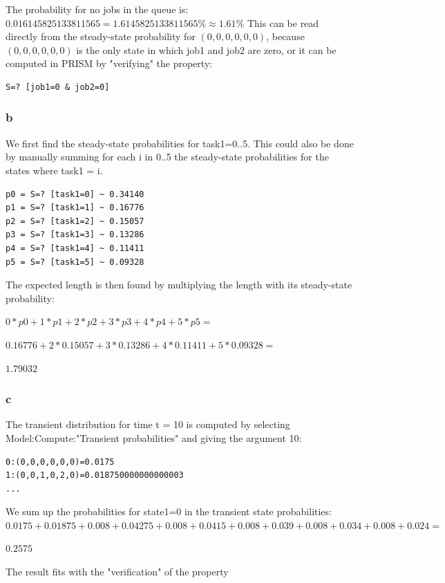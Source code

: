 The probability for no jobs in the queue is: $0.016145825133811565 = 1.6145825133811565\% \approx 1.61\%$
This can be read directly from the steady-state probability for $(0,0,0,0,0,0)$,
because $(0,0,0,0,0,0)$ is the only state in which job1 and job2 are zero,
or it can be computed in PRISM by "verifying" the property:

\begin{verbatim}
S=? [job1=0 & job2=0]
\end{verbatim}

\subsubsection{b}

We first find the steady-state probabilities for task1=0..5.
This could also be done by manually summing for each i in 0..5
the steady-state probabilities for the states where task1 = i.

\begin{verbatim}
p0 = S=? [task1=0] ~ 0.34140
p1 = S=? [task1=1] ~ 0.16776
p2 = S=? [task1=2] ~ 0.15057
p3 = S=? [task1=3] ~ 0.13286
p4 = S=? [task1=4] ~ 0.11411
p5 = S=? [task1=5] ~ 0.09328
\end{verbatim}

The expected length is then found by
multiplying the length with its steady-state probability:

$0*p0 + 1*p1 + 2*p2 + 3*p3 + 4*p4 + 5*p5 =$

$0.16776 + 2*0.15057 + 3*0.13286 + 4*0.11411 + 5*0.09328 =$

$1.79032$

\subsubsection{c}

The transient distribution for time t = 10 is computed by
selecting Model:Compute:"Transient probabilities"
and giving the argument 10:

\begin{verbatim}
0:(0,0,0,0,0,0)=0.0175
1:(0,0,1,0,2,0)=0.018750000000000003
...
\end{verbatim}

We sum up the probabilities for state1=0 in the transient state probabilities:
$0.0175 + 0.01875 + 0.008 + 0.04275 + 0.008 + 0.0415 + 0.008 + 0.039 + 0.008 + 0.034 + 0.008 + 0.024 =$

$0.2575$

The result fits with the "verification" of the property

